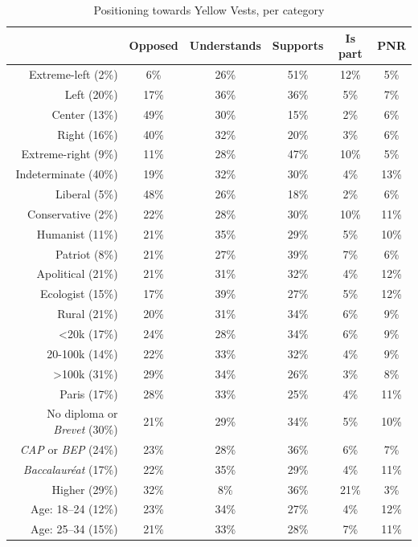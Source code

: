 \documentclass[english,5p,authoryear]{elsarticle}
\begin{document}
\begin{appendices}
\begin{spacing}{1.8}
\begin{table}[ht]
\centering
\caption{Positioning towards Yellow Vests, per category}
{\fontsize{10}{16}\selectfont
\begin{tabular}{rccccc}
  \hline \hline
 & Opposed & Understands & Supports & Is part & PNR \\ 
  \hline
  Extreme-left (2\%) & 6\% & 26\% & 51\% & 12\% & 5\% \\ 
  Left (20\%) & 17\% & 36\% & 36\% & 5\% & 7\% \\ 
  Center (13\%) & 49\% & 30\% & 15\% & 2\% & 6\% \\ 
  Right (16\%) & 40\% & 32\% & 20\% & 3\% & 6\% \\ 
  Extreme-right (9\%) & 11\% & 28\% & 47\% & 10\% & 5\% \\
  Indeterminate (40\%) & 19\% & 32\% & 30\% & 4\% & 13\% \\
  \hline
  Liberal (5\%) & 48\% & 26\% & 18\% & 2\% & 6\% \\
  Conservative (2\%) & 22\% & 28\% & 30\% & 10\% & 11\% \\
  Humanist (11\%) & 21\% & 35\% & 29\% & 5\% & 10\% \\
  Patriot (8\%) & 21\% & 27\% & 39\% & 7\% & 6\% \\
  Apolitical (21\%) & 21\% & 31\% & 32\% & 4\% & 12\% \\
  Ecologist (15\%) & 17\% & 39\% & 27\% & 5\% & 12\% \\
  \hline
  Rural (21\%) & 20\% & 31\% & 34\% & 6\% & 9\% \\ 
  <20k (17\%) & 24\% & 28\% & 34\% & 6\% & 9\% \\ 
  20-100k (14\%) & 22\% & 33\% & 32\% & 4\% & 9\% \\ 
  >100k (31\%) & 29\% & 34\% & 26\% & 3\% & 8\% \\ 
  Paris (17\%) & 28\% & 33\% & 25\% & 4\% & 11\% \\
  \hline
  No diploma or \textit{Brevet} (30\%) & 21\% & 29\% & 34\% & 5\% & 10\% \\ 
  \textit{CAP} or \textit{BEP} (24\%) & 23\% & 28\% & 36\% & 6\% & 7\% \\ 
  \textit{Baccalauréat} (17\%) & 22\% & 35\% & 29\% & 4\% & 11\% \\ 
  Higher (29\%) & 32\% & 8\% & 36\% & 21\% & 3\% \\
  \hline
  Age: 18--24 (12\%) & 23\% & 34\% & 27\% & 4\% & 12\% \\ 
  Age: 25--34 (15\%) & 21\% & 33\% & 28\% & 7\% & 11\% \\ 

\end{tabular}}
\end{table}
\end{spacing}
\end{appendices}
\end{document}
